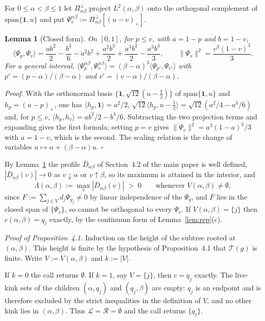 \documentclass[12pt, a4paper]{article}
\newcommand{\qed}{\hfill$\square$}
\newenvironment{proof}[1][Proof]{\par\noindent\textit{#1.}\space}{\qed\par\medskip}
\newtheorem{lemma}{Lemma}[section]
\newcommand{\proppop}{Proposition~4.1}
\begin{document}
For $0 \le \alpha < \beta \le 1$ let $\Pi^\perp_{\alpha\beta}$ project
$L^2(\alpha,\beta)$ onto the orthogonal complement of
$\mathrm{span}\{\mathbf 1, u\}$ and put
$\Psi^{\alpha\beta}_v := \Pi^\perp_{\alpha\beta}[(u-v)_+]$.

\begin{lemma}[Closed form]
\label{lem:gram}
On $[0,1]$, for $p \le v$, with $a = 1-p$ and $b = 1-v$,
\[
\langle \Psi_p, \Psi_v\rangle = \frac{ab^2}{2} - \frac{b^3}{6} - a^2b^2
+ \frac{a^2b^3}{2} + \frac{a^3b^2}{2} - \frac{a^3b^3}{3},
\qquad
\|\Psi_v\|^2 = \frac{v^3(1-v)^3}{3} .
\]
For a general interval, $\langle \Psi^{\alpha\beta}_p,
\Psi^{\alpha\beta}_v\rangle = (\beta-\alpha)^3 \langle \Psi_{p'},
\Psi_{v'}\rangle$ with $p' = (p-\alpha)/(\beta-\alpha)$ and
$v' = (v-\alpha)/(\beta-\alpha)$.
\end{lemma}

\begin{proof}
With the orthonormal basis $\{\mathbf 1, \sqrt{12}(u-\tfrac12)\}$ of
$\mathrm{span}\{\mathbf 1, u\}$ and $h_p = (u-p)_+$, one has
$\langle h_p,\mathbf 1\rangle = a^2/2$,
$\sqrt{12}\langle h_p, u-\tfrac12\rangle = \sqrt{12}(a^2/4 - a^3/6)$ and,
for $p \le v$, $\langle h_p,h_v\rangle = ab^2/2 - b^3/6$. Subtracting the two
projection terms and expanding gives the first formula; setting $p = v$ gives
$\|\Psi_v\|^2 = a^3(1-a)^3/3$ with $a = 1-v$, which is the second. The scaling
relation is the change of variables $u \mapsto \alpha + (\beta-\alpha)u$. 
\end{proof}

By Lemma~\ref{lem:gram} the profile $\bar D_{\alpha\beta}$ of
Section~4.2 of the main paper is well defined, $|\bar D_{\alpha\beta}(v)| \to 0$ as
$v \downarrow \alpha$ or $v \uparrow \beta$, so its maximum is attained in the
interior, and
\[
\Lambda(\alpha,\beta) := \max_v |\bar D_{\alpha\beta}(v)| \;>\; 0
\qquad \text{whenever } V(\alpha,\beta) \ne \emptyset,
\]
since $F := \sum_{j \in V} d_j \Psi_{q_j} \ne 0$ by linear independence of the
$\Psi_q$, and $F$ lies in the closed span of $\{\Psi_v\}$, so cannot be
orthogonal to every $\Psi_v$. If $V(\alpha,\beta) = \{j\}$ then
$c(\alpha,\beta) = q_j$ exactly, by the continuum form of
Lemma~\ref{lem:rep}(c).

\medskip
\noindent\textit{Proof of \proppop{}.}
Induction on the height of the subtree rooted at $(\alpha,\beta)$. This height
is finite by the hypothesis of \proppop{} that $\mathcal{T}(g)$ is finite.
Write $V:=V(\alpha,\beta)$ and $k:=|V|$.

If $k = 0$ the call returns $\emptyset$. If $k = 1$, say $V = \{j\}$, then
$c = q_j$ exactly. The live-kink sets of the children
$(\alpha,q_j)$ and $(q_j,\beta)$ are empty: $q_j$ is an endpoint and is
therefore excluded by the strict inequalities in the definition of $V$, and no
other kink lies in $(\alpha,\beta)$. Thus
$\mathcal{L} = \mathcal{R} = \emptyset$ and the call returns $\{q_j\}$.
\end{document}
